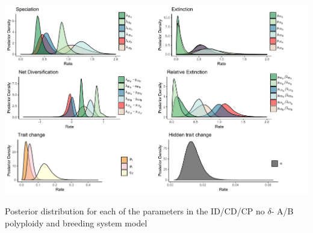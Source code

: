 \begin{suppfigure}
\includegraphics[width=\textwidth]{muhisseDPSInodipposteriordist.pdf}
\caption{Posterior distribution for each of the parameters in the ID/CD/CP no $\delta$- A/B polyploidy and breeding system model} %
\label{suppfigure:IDCDCPnodipAB}
\end{suppfigure}

